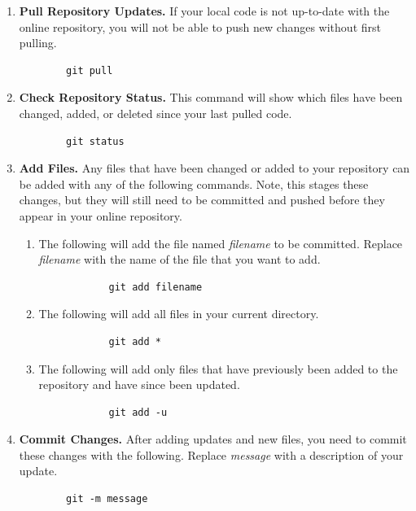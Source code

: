 \documentclass{article} %
\begin{document}
\begin{enumerate}
    \item \textbf{Pull Repository Updates.} If your local code is not up-to-date with the online repository, you will not be able to push new changes without first pulling.
    \begin{verbatim}
        git pull
    \end{verbatim}

    \item \textbf{Check Repository Status.} This command will show which files have been changed, added, or deleted since your last pulled code.
    \begin{verbatim}
        git status
    \end{verbatim}
    
    \item \textbf{Add Files.}  Any files that have been changed or added to your repository can be added with any of the following commands.  Note, this stages these changes, but they will still need to be committed and pushed before they appear in your online repository.
    \begin{enumerate}
        \item The following will add the file named \emph{filename} to be committed.  Replace \emph{filename} with the name of the file that you want to add.  
        \begin{verbatim}
            git add filename
        \end{verbatim}
        \item The following will add all files in your current directory.
        \begin{verbatim}
            git add *
        \end{verbatim}
        \item The following will add only files that have previously been added to the repository and have since been updated.
        \begin{verbatim}
            git add -u
        \end{verbatim}
    \end{enumerate}

    \item \textbf{Commit Changes.}  After adding updates and new files, you need to commit these changes with the following. Replace \emph{message} with a description of your update.
    \begin{verbatim}
        git -m message
    \end{verbatim}


\end{enumerate}
\end{document}
